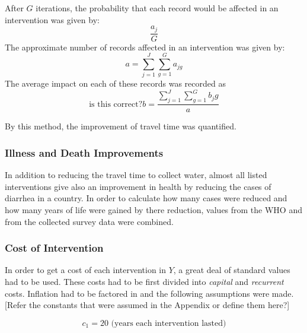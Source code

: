 After $G$ iterations, the probability that each record would be affected in an intervention was given by:
\begin{equation*}
\frac{a_j}{G}
\end{equation*}
The approximate number of records affected in an intervention was given by:
\begin{equation*}
a = \sum_{j=1}^{J} \sum_{g=1}^{G} a_{jg}
\end{equation*}
The average impact on each of these records was recorded as
\begin{equation*}
\text{is this correct?}
b = \frac{\sum_{j=1}^{J} \sum_{g=1}^{G} b_jg}{a}
\end{equation*}

By this method, the improvement of travel time was quantified.

\subsubsection*{Illness and Death Improvements}
In addition to reducing the travel time to collect water, almost all listed interventions give also an improvement in health by reducing the cases of diarrhea in a country.
In order to calculate how many cases were reduced and how many years of life were gained by there reduction, values from the WHO and from the collected survey data were combined.

\subsubsection*{Cost of Intervention}
In order to get a cost of each intervention in $Y$, a great deal of standard values had to be used.
These costs had to be first divided into \emph{capital} and \emph{recurrent} costs.
Inflation had to be factored in and the following assumptions were made.
[Refer the constants that were assumed in the Appendix or define them here?]

$$c_1 = 20 \text{ (years each intervention lasted)}$$








